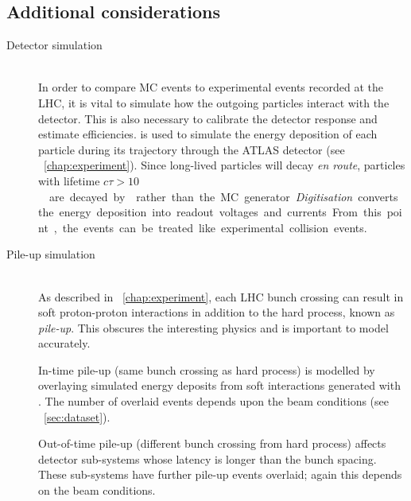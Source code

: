 \subsection{Additional considerations}
\label{sec:mc:other}

\begin{description}
\item[Detector simulation] \hfill \\
	In order to compare \ac{MC} events to experimental events recorded at the \acs{LHC}, 
	it is vital to simulate how the outgoing particles interact with the detector. This 
	is also necessary to calibrate the detector response and estimate efficiencies. 
	\geant \cite{GEANT4,ATLAS-simulation} is used to simulate the energy deposition of 
	each particle during its trajectory through the ATLAS detector (see 
	\Chapter~\ref{chap:experiment}). Since long-lived particles will decay \textit{en 
	route}, particles with lifetime \unit{$c\tau > 10$}{\milli\metre} are decayed by 
	\geant rather than the \ac{MC} generator.

	\textit{Digitisation} converts the energy deposition into readout voltages and 
	currents. From this point, the events can be treated like experimental collision 
	events.
\item[Pile-up simulation] \hfill \\
	As described in \Chapter~\ref{chap:experiment}, each \acs{LHC} bunch crossing can 
	result in soft proton-proton interactions in addition to the hard process, known as 
	\textit{pile-up}. This obscures the interesting physics and is important to model 
	accurately.

	In-time pile-up (same bunch crossing as hard process) is modelled by overlaying 
	simulated energy deposits from soft \pp interactions generated with . The 
	number of overlaid events depends upon the beam conditions (see 
	\Section~\ref{sec:dataset}).

	Out-of-time pile-up (different bunch crossing from hard process) affects detector 
	sub-systems whose latency is longer than the bunch spacing. These sub-systems have 
	further pile-up events overlaid; again this depends on the beam conditions.
\end{description}
